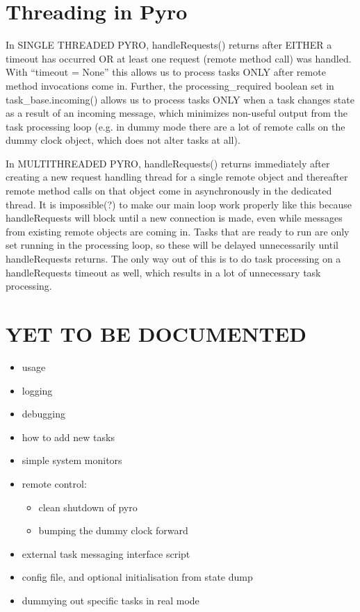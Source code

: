 \documentclass[a4paper,12pt]{amsart}
\begin{document}
\section{Threading in Pyro}

In SINGLE THREADED PYRO, handleRequests() returns after EITHER a timeout has
occurred OR at least one request (remote method call) was handled.  With
``timeout = None'' this allows us to process tasks ONLY after remote method
invocations come in. Further, the processing\_required boolean set in
task\_base.incoming() allows us to process tasks ONLY when a task changes state
as a result of an incoming message, which minimizes non-useful output from the
task processing loop (e.g. in dummy mode there are a lot of remote calls on
the dummy clock object, which does not alter tasks at all). 

In MULTITHREADED PYRO, handleRequests() returns immediately after creating a
new request handling thread for a single remote object and thereafter remote
method calls on that object come in asynchronously in the dedicated thread.
It is impossible(?) to make our main loop work properly like this because
handleRequests will block until a new connection is made, even while messages
from existing remote objects are coming in.  Tasks that are ready to run are
only set running in the processing loop, so these will be delayed
unnecessarily until handleRequests returns.  The only way out of this is to do
task processing on a handleRequests timeout as well, which results in a lot of
unnecessary task processing.
 

\section{YET TO BE DOCUMENTED}

\begin{itemize}
 \item usage
 \item logging
 \item debugging
 \item how to add new tasks
 \item simple system monitors
 \item remote control: 
    \begin{itemize}
    \item clean shutdown of pyro
    \item bumping the dummy clock forward
    \end{itemize}
 \item external task messaging interface script
 \item config file, and optional initialisation from state dump
 \item dummying out specific tasks in real mode
\end{itemize}
\end{document}
